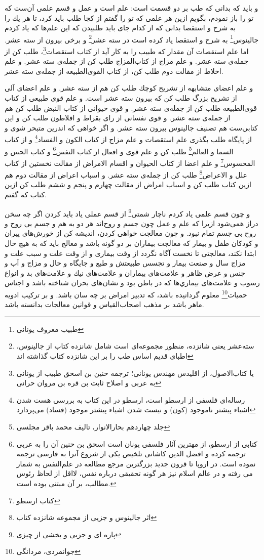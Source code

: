 و بايد كه بدانى كه طب بر دو قسمت است: علم است و عمل و قسم علمى آن‌ست كه تو را باز نمودم، بگويم ازين هر علمى كه تو را گفتم از كجا طلب بايد كرد، تا هر يك را به شرح و استقصا بدانى كه از كدام جاى بايد طلبيدن كه اين علم‌ها كه ياد كردم جالينوس\footnote{طبیب معروف یونانی} به شرح و استقصا ياد كرده است در سته عشر\footnote{سته‌عشر یعنی شانزده، منظور مجموعه‌ای است شامل شانزده کتاب از جالینوس، اطبای قدیم اساس طب را بر این شانزده کتاب گذاشته اند} و برخى بيرون از سته عشر. اما علم استقصات آن مقدار كه طبيب را به كار آيد از كتاب استقصات\footnote{یا کتاب‌الاصول، از اقلیدس مهندس یونانی؛ ترجمه حنین بن اسحق طبیب از یونانی به عربی و اصلاح ثابت بن قره بن مروان حرانی}، طلب كن از جمله‌ی سته عشر. و علم مزاج از كتاب‌المزاج طلب كن از جمله‌ی سته عشر. و علم اخلاط از مقالت دوم طلب كن، از كتاب القوى‌الطبيعه از جمله‌ی سته عشر.

و علم اعضاى متشابهه از تشريح كوچك طلب كن هم از سته عشر. و علم اعضاى آلى از تشريح بزرگ طلب كن كه بيرون سته عشر است. و علم قوى طبيعى از كتاب قوى‌الطبيعه طلب كن از جمله‌ی سته عشر. و قوى حيوانى از كتاب النبض طلب كن هم از جمله‌ی سته عشر. و قوى نفسانى از راى بقراط و افلاطون طلب كن و اين كتابي‌ست هم تصنيف جالينوس بيرون سته عشر. و اگر خواهى كه اندرين متبحر شوى و از پايگاه طلب بگذرى علم استقصات و علم مزاج از كتاب الكون و الفساد\footnote{رساله‌ای فلسفی از ارسطو است، ارسطو در این کتاب به بررسی هست شدن اشیاء پیشتر ناموجود (کون) و نیست شدن اشیاء پیشتر موجود (فساد) می‌پردازد} و از كتاب السما و العالم\footnote{جلد چهاردهم بحارالانوار، تالیف محمد باقر مجلسی} طلب كن و علم قوى و افعال از كتاب النفس\footnote{کتابی از ارسطو، از مهترین آثار فلسفی یونان است اسحق بن حنین آن را به عربی ترجمه کرده و افضل الدین کاشانی تلخیص یکی از شروع آنرا به فارسی ترجمه نموده است.  در اروپا تا قرون جدید بزرگترین مرجع مطالعه در علم‌النفس به شمار می رفته و در عالم اسلام نیز هر گونه تحقیقی درباره نفس، لااقل از لحاظ رئوس مطالب، بر آن مبتنی بوده است.} و كتاب الحس و المحسوس\footnote{کتاب ارسطو} و علم اعضا از كتاب الحيوان و اقسام الامراض از مقالت نخستين از كتاب علل و الاعراض\footnote{اثر جالینوس و جزیی از مجموعه شانزده کتاب} طلب كن از جمله‌ی سته عشر. و اسباب اعراض از مقالت دوم هم ازين كتاب طلب كن و اسباب امراض از مقالت چهارم و پنجم و ششم طلب كن ازين كتاب كه گفتم.

و چون قسم علمى ياد كردم ناچار شمتى\footnote{پاره ای و جزیی و بخشی از چیزی} از قسم عملى ياد بايد كردن اگر چه سخن دراز همى‌شود ازيرا كه علم و عمل چون جسم و روح‌اند هر دو به هم و جسم بى‌ روح و روح بى‌ جسم تمام نبود. و چون معالجت خواهى كردن، انديشه كن از خورش‌هاى پيران و كودكان طفل و بيمار كه معالجت بيماران بر دو گونه باشد و معالج بايد كه به هيچ حال ابتدا نكند، معالجتى تا نخست آگاه نگردد از وقت بيمارى و از وقت علت و سبب علت و مزاج سال و صنعت بيمار و تجسس طبيعتش و طبع و جايگاه و حال و مزاج و آب و جنس و عرض ظاهر و علامت‌هاى بيماران و علامت‌هاى نيك و علامت‌هاى بد و انواع رسوب و علامت‌هاى بيماري‌ها كه در باطن بود و نشان‌هاى بحران شناخته باشد و اجناس حميات\footnote{جوانمردی، مردانگی} معلوم گردانيده باشد، كه تدبير امراض بر چه سان باشد. و بر تركيب ادويه ماهر باشد بر مذهب اصحاب‌القياس و قوانين معالجات بدانسته باشد.

